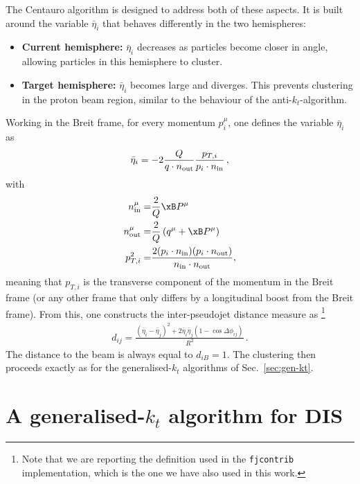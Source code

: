 The Centauro algorithm
is designed to address both of these aspects. It is built around
the variable $\bar{\eta}_i$ that behaves
differently in the two hemispheres:
\begin{itemize}
\item \textbf{Current hemisphere:}  
      $\bar{\eta}_i$ decreases as particles become closer in angle, allowing particles in this hemisphere to cluster.
\item \textbf{Target hemisphere:}  
      $\bar{\eta}_i$ becomes large and diverges. This prevents clustering in the proton beam region, similar to the behaviour of the anti-$k_t$-algorithm.
\end{itemize}
%
Working in the Breit frame, for every momentum $p_i^\mu$, one defines the variable $\bar{\eta}_i$ as
\begin{align}
\bar{\eta}_i = -2\frac{Q}{q\cdot n_{\rm out}} \frac{p_{T,i}}{p_i \cdot n_{\rm in}}\,,
\end{align}
with 
\begin{subequations}
  \begin{align}
  n_{\rm in}^\mu =& \frac{2}{Q}\xB P^\mu \\
  n_{\rm out}^\mu =& \frac{2}{Q} \left(q^\mu +\xB P^\mu \right)\\
  p_{T,i}^2 =& \frac{2 (p_i \cdot n_{\rm in})(p_i \cdot n_{\rm out})}{ n_{\rm in}\cdot n_{\rm out}},
\end{align}
\end{subequations}
meaning that $p_{T,i}$ is the transverse component of the momentum in the Breit frame (or any other frame that only differs by a longitudinal boost from the Breit frame).
%
From this, one constructs the inter-pseudojet distance measure as
\footnote{Note that we are reporting the definition used in the \texttt{fjcontrib} implementation, which is the one we have also used in this work.}
\begin{align}
\label{eq:cent-dij}
d_{ij} = \frac{(\bar{\eta}_i - \bar{\eta}_j)^2 + 2 \bar{\eta}_i \bar{\eta}_j (1- \cos \Delta \phi_{ij})}{R^2}\,.
\end{align}
The distance to the beam is always equal to $d_{iB} = 1$. 
%
The clustering then proceeds exactly as for the generalised-$k_t$ algorithms of Sec.~\ref{sec:gen-kt}.

\section{A generalised-$k_t$ algorithm for DIS}
\label{sec:ourDISalgo}
